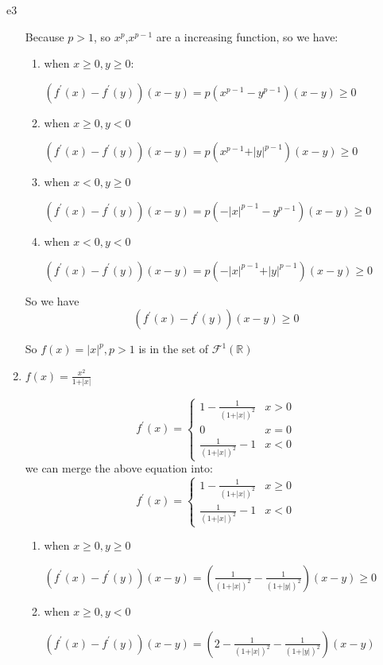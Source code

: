 \documentclass{article}
\begin{document}
\begin{PROOF}{e3}
\begin{enumerate}
		Because $p>1$, so $x^{p}$,$x^{p-1}$ are a increasing function, so we have:
		\begin{enumerate}
			\item when $x\ge 0,y\ge 0$:
			
			$\left( f^{'}(x)-f^{'}(y)\right) (x-y) = p(x^{p-1}-y^{p-1})(x-y)\ge 0$
			\item when $x\ge 0,y<0$
			
			$\left( f^{'}(x)-f^{'}(y)\right) (x-y) = p(x^{p-1}+\vert y\vert ^{p-1})(x-y)\ge 0$
			\item when $x<0,y\ge 0$
			
			$\left( f^{'}(x)-f^{'}(y)\right) (x-y) = p(-\vert x\vert ^{p-1}-y^{p-1})(x-y) \ge 0$

			\item when $x<0,y<0$
			
			$\left( f^{'}(x)-f^{'}(y)\right) (x-y) = p(-\vert x\vert ^{p-1}+\vert y\vert ^{p-1})(x-y)\ge 0$

		\end{enumerate}
		So we have 
		\[\left( f^{'}(x)-f^{'}(y)\right) (x-y)\ge 0\]
		
		So $f(x)=\lvert x\rvert^p,p>1$ is in the set of $\mathcal{F}^1(\mathbb{R})$
	\item $f(x)=\frac{x^2}{1+\vert x\vert}$
		
		\begin{equation}
			f^{'}(x)=\begin{cases}
				1-\frac{1}{(1+\vert x\vert)^2}&x>0\\
				0&x=0\\
				\frac{1}{(1+\vert x\vert)^2}-1&x<0
			\end{cases}
		\end{equation}
		we can merge the above equation into:
		\begin{equation}
			f^{'}(x)=\begin{cases}
				1-\frac{1}{(1+\vert x\vert)^2}&x\ge 0\\
				\frac{1}{(1+\vert x\vert)^2}-1&x<0
			\end{cases}
		\end{equation}
		\begin{enumerate}
			\item when $x\ge 0,y\ge 0$
			
			$\left( f^{'}(x)-f^{'}(y)\right) (x-y)=(\frac{1}{(1+\vert x\vert)^2}-\frac{1}{(1+\vert y\vert)^2})(x-y)\ge 0 $
			\item when $x\ge 0,y<0$
			
			$\left( f^{'}(x)-f^{'}(y)\right) (x-y)=(2-\frac{1}{(1+\vert x\vert)^2}-\frac{1}{(1+\vert y\vert)^2})(x-y)$
			

\end{enumerate}
\end{enumerate}
\end{PROOF}
\end{document}
